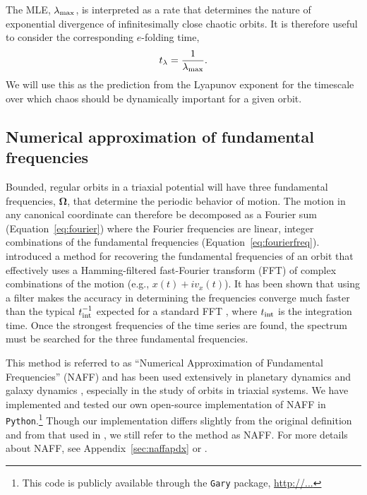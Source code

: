 \documentclass[letterpaper,12pt,preprint]{aastex}
\newcommand{\bs}[1]{\boldsymbol{#1}}
\newcommand{\inttime}{t_{\rm int}}
\begin{document}
The MLE, $\lambda_{\rm max}$, is interpreted as a rate that determines the nature of exponential divergence of infinitesimally close chaotic orbits. It is therefore useful to consider the corresponding $e$-folding time, 
\begin{equation}
	t_{\rm \lambda} = \frac{1}{\lambda_{\rm max}}.
\end{equation}
We will use this as the prediction from the Lyapunov exponent for the timescale over which chaos should be dynamically important for a given orbit. 

\subsection{Numerical approximation of fundamental frequencies}\label{sec:naff}

Bounded, regular orbits in a triaxial potential will have three fundamental frequencies, $\bs{\Omega}$, that determine the periodic behavior of motion. The motion in any canonical coordinate can therefore be decomposed as a Fourier sum (Equation~\ref{eq:fourier}) where the Fourier frequencies are linear, integer combinations of the fundamental frequencies (Equation~\ref{eq:fourierfreq}). \cite{laskar93} introduced a method for recovering the fundamental frequencies of an orbit that effectively uses a Hamming-filtered fast-Fourier transform (FFT) of complex combinations of the motion (e.g., $x(t) + i v_x(t)$). It has been shown that using a filter makes the accuracy in determining the frequencies converge much faster than the typical $\inttime^{-1}$ expected for a standard FFT \citep{laskar99}, where $\inttime$ is the integration time. Once the strongest frequencies of the time series are found, the spectrum must be searched for the three fundamental frequencies.

This method is referred to as ``Numerical Approximation of Fundamental Frequencies'' (NAFF) and has been used extensively in planetary dynamics \citep{} and galaxy dynamics \citep{valluri98}, especially in the study of orbits in triaxial systems. We have implemented and tested our own open-source implementation of NAFF in \texttt{Python}.\footnote{This code is publicly available through the \texttt{Gary} package, \url{http://...}} Though our implementation differs slightly from the original definition and from that used in \cite{valluri98}, we still refer to the method as NAFF. For more details about NAFF, see Appendix~\ref{sec:naffapdx} or \cite{papaphilippou96, laskar, etc.}.
\end{document}
